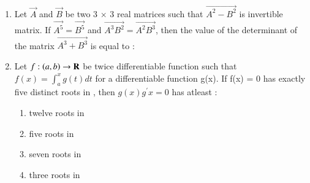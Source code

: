 \documentclass[journal,12pt,onecolumn]{IEEEtran}
\theoremstyle{remark}
\begin{document}
\begin{enumerate}
\begin{enumerate}
		\end{enumerate}
	\item Let $\vec{A}$ and $\vec{B}$ be two 3 $\times$ 3 real matrices such that $\vec{A^2 - B^2}$ is invertible matrix. If $\vec{A^5} = \vec{B^5}$ and $\vec{A^3B^2} = \vec{A^2B^3}$, then the value of the determinant of the matrix $\vec{A^3 + B^3}$ is equal to :
		\begin{enumerate}
		\end{enumerate}
	\item Let $ f : \left(a,b\right) \to \mathbf{R}$ be twice differentiable function such that $ f(x) = \int_{a}^{x} g(t) dt$ for a differentiable function g(x). If f(x) = 0 has exactly five distinct roots in , then $g(x)g^{\prime}{x} = 0$ has atleast :
		\begin{enumerate}
			\item twelve roots in \brak{a,b}
			\item five roots in \brak{a,b}
			\item seven roots in \brak{a,b}
			\item three roots in \brak{a,b}
		\end{enumerate}
\end{enumerate}
\end{document}
